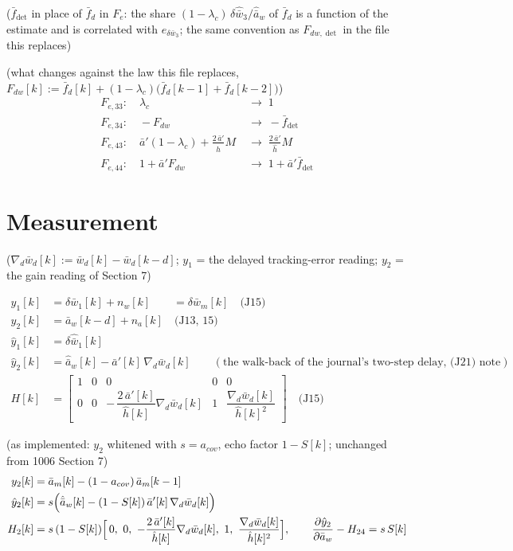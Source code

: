 \documentclass[11pt,a4paper,fontset=none]{ctexart}
\newcommand{\ba}{\bar{a}}
\newcommand{\bw}{\bar{w}}
\newcommand{\ap}{\ba'}
\newcommand{\ah}{\hat{\ba}_w}
\newcommand{\hh}{\hat{h}}
\newcommand{\lc}{\lambda_c}
\newcommand{\fd}{\bar{f}_d}
\newcommand{\fdet}{\bar{f}_{\det}}
\newcommand{\am}{\ba_m}
\newcommand{\J}[1]{\quad\text{(J#1)}}
\begin{document}
($\fdet$ in place of $\fd$ in $F_e$: the share $(1-\lc)\,\delta\hat{\bw}_3/\ah$ of $\fd$ is a function of the estimate and is
correlated with $e_{\delta\bw_3}$; the same convention as $F_{dw,\det}$ in the file this replaces)

(what changes against the law this file replaces, $F_{dw}[k] := \fd[k] + (1-\lc)\bigl(\fd[k-1] + \fd[k-2]\bigr)$)
\begin{align*}
F_{e,33}:\quad \lc &\;\to\; 1 \\
F_{e,34}:\quad -F_{dw} &\;\to\; -\fdet \\
F_{e,43}:\quad \ap(1-\lc) + \frac{2\,\ap}{\hh}M &\;\to\; \frac{2\,\ap}{\hh}M \\
F_{e,44}:\quad 1 + \ap F_{dw} &\;\to\; 1 + \ap\fdet
\end{align*}

\section{Measurement}

($\nabla_d\bw_d[k] := \bw_d[k] - \bw_d[k-d]$; $y_1$ = the delayed tracking-error reading; $y_2$ = the gain reading of Section 7)

\begin{align*}
y_1[k]      &= \delta\bw_1[k] + n_w[k] \qquad = \delta\bw_m[k] \J{15} \\
y_2[k]      &= \ba_w[k-d] + n_a[k] \J{13, 15} \\
\hat y_1[k] &= \delta\hat{\bw}_1[k] \\
\hat y_2[k] &= \ah[k] - \ap[k]\,\nabla_d\bw_d[k] \qquad(\text{the walk-back of the journal's two-step delay, (J21) note}) \\[4pt]
H[k]        &= \begin{bmatrix} 1 & 0 & 0 & 0 & 0 \\[2pt]
               0 & 0 & -\,\dfrac{2\,\ap[k]}{\hh[k]}\nabla_d\bw_d[k] & 1 & \dfrac{\nabla_d\bw_d[k]}{\hh[k]^{2}} \end{bmatrix} \J{15}
\end{align*}

(as implemented: $y_2$ whitened with $s = a_{cov}$, echo factor $1 - S[k]$; unchanged from 1006 Section 7)
\begin{align*}
y_2[k]        &= \am[k] - (1 - a_{cov})\,\am[k-1] \\
\hat y_2[k]   &= s\Bigl(\ah[k] - (1-S[k])\,\ap[k]\,\nabla_d\bw_d[k]\Bigr) \\
H_2[k]        &= s\,(1-S[k])\Bigl[\,0,\ 0,\ -\frac{2\,\ap[k]}{\hh[k]}\nabla_d\bw_d[k],\ 1,\ \frac{\nabla_d\bw_d[k]}{\hh[k]^{2}}\Bigr], \qquad
\frac{\partial\hat y_2}{\partial\ba_w} - H_{24} = s\,S[k]
\end{align*}
\end{document}
